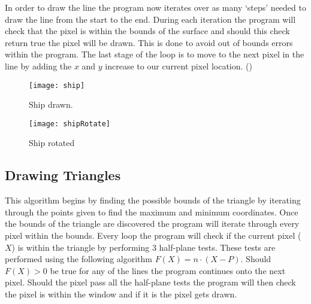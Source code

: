 \documentclass[
	letterpaper, %
	10pt, %
]{CSUniSchoolLabReport}
\begin{document}
\begin{flushleft}
	In order to draw the line the program now iterates over as many `steps'
	needed to draw the line from the start to the end. During each iteration
	the program will check that the pixel is within the bounds of the surface
	and should this check return true the pixel will be drawn. This is done to 
	avoid out of bounds errors within the program. The last stage of the loop is 
	to move to the next pixel in the line by adding the \(x\) and \(y\) increase 
	to our current pixel location. (\cite{Kamble:2021})
\end{flushleft}



\begin{figure}[H]
	\centering
	\begin{minipage}[b]{0.4\textwidth}
		\texttt{[image: ship]}
		\caption{Ship drawn.}
	\end{minipage}
	\hfill
	\begin{minipage}[b]{0.4\textwidth}
		\texttt{[image: shipRotate]}
		\caption{Ship rotated}
  	\end{minipage}
\end{figure}

\subsection{Drawing Triangles}
\begin{flushleft}
	This algorithm begins by finding the possible bounds of the triangle by 
	iterating through the points given to find the maximum and minimum coordinates. 
	Once the bounds of the triangle are discovered the program will iterate 
	through every pixel within the bounds. Every loop the program will check 
	if the current pixel (\(X\)) is within the triangle by performing 3 half-plane tests.
	These tests are performed using the following algorithm \(F(X)=n \cdot (X - P)\).
	Should \(F(X) > 0\) be true for any of the lines the program continues onto 
	the next pixel. Should the pixel pass all the half-plane tests the program will 
	then check the pixel is within the window and if it is the pixel gets drawn. 

\end{flushleft}
\end{document}
